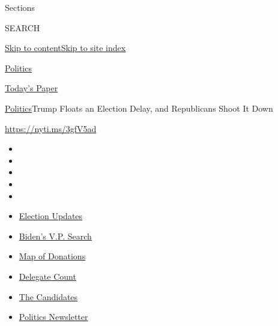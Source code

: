 Sections

SEARCH

\protect\hyperlink{site-content}{Skip to
content}\protect\hyperlink{site-index}{Skip to site index}

\href{https://www.nytimes3xbfgragh.onion/section/politics}{Politics}

\href{https://myaccount.nytimes3xbfgragh.onion/auth/login?response_type=cookie\&client_id=vi}{}

\href{https://www.nytimes3xbfgragh.onion/section/todayspaper}{Today's
Paper}

\href{/section/politics}{Politics}\textbar{}Trump Floats an Election
Delay, and Republicans Shoot It Down

\url{https://nyti.ms/3gfV5ad}

\begin{itemize}
\item
\item
\item
\item
\item
\end{itemize}

\begin{itemize}
\item
  \href{https://www.nytimes3xbfgragh.onion/2020/08/04/us/elections/primary-election-michigan-arizona-kansas.html?action=click\&pgtype=Article\&state=default\&region=TOP_BANNER\&context=storylines_menu}{Election
  Updates}
\item
  \href{https://www.nytimes3xbfgragh.onion/article/biden-vice-president-2020.html?action=click\&pgtype=Article\&state=default\&region=TOP_BANNER\&context=storylines_menu}{Biden's
  V.P. Search}
\item
  \href{https://www.nytimes3xbfgragh.onion/interactive/2020/07/24/us/politics/trump-biden-campaign-donors.html?action=click\&pgtype=Article\&state=default\&region=TOP_BANNER\&context=storylines_menu}{Map
  of Donations}
\item
  \href{https://www.nytimes3xbfgragh.onion/interactive/2020/us/elections/delegate-count-primary-results.html?action=click\&pgtype=Article\&state=default\&region=TOP_BANNER\&context=storylines_menu}{Delegate
  Count}
\item
  \href{https://www.nytimes3xbfgragh.onion/interactive/2019/us/politics/2020-presidential-candidates.html?action=click\&pgtype=Article\&state=default\&region=TOP_BANNER\&context=storylines_menu}{The
  Candidates}
\item
  \href{https://www.nytimes3xbfgragh.onion/newsletters/politics?action=click\&pgtype=Article\&state=default\&region=TOP_BANNER\&context=storylines_menu}{Politics
  Newsletter}
\end{itemize}

